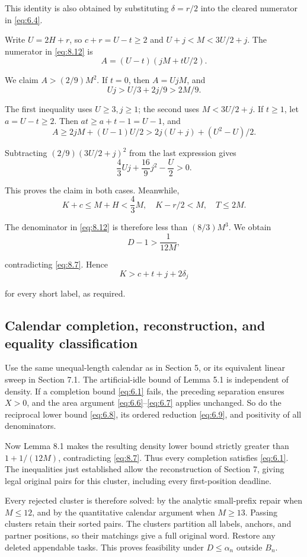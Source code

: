 \documentclass[11pt,a4paper]{article}
\begin{document}
This identity is also obtained by substituting \(\delta=r/2\) into the cleared numerator in \eqref{eq:6.4}.

Write \(U=2H+r\), so \(c+r=U-t\ge2\) and \(U+j<M<3U/2+j\). The numerator in \eqref{eq:8.12} is
\[
A=(U-t)(jM+tU/2).
\]

We claim \(A>(2/9)M^2\). If \(t=0\), then \(A=UjM\), and
\[
Uj>U/3+2j/9>2M/9.
\]

The first inequality uses \(U\ge3,j\ge1\); the second uses \(M<3U/2+j\). If \(t\ge1\), let \(a=U-t\ge2\). Then \(at\ge a+t-1=U-1\), and
\[
A\ge2jM+(U-1)U/2
>2j(U+j)+(U^2-U)/2.
\]

Subtracting \((2/9)(3U/2+j)^2\) from the last expression gives
\[
\frac43Uj+\frac{16}{9}j^2-\frac U2>0.
\]

This proves the claim in both cases. Meanwhile,
\[
K+c\le M+H<\frac43M,\quad K-r/2<M,\quad T\le2M.
\]

The denominator in \eqref{eq:8.12} is therefore less than \((8/3)M^3\). We obtain
\[
D-1>\frac1{12M},
\]

contradicting \eqref{eq:8.7}. Hence
\[
K>c+t+j+2\delta_j
\]

for every short label, as required.

\hypertarget{calendar-completion-reconstruction-and-equality-classification}{%
\subsection{Calendar completion, reconstruction, and equality classification}\label{calendar-completion-reconstruction-and-equality-classification}}

Use the same unequal-length calendar as in Section 5, or its equivalent linear sweep in Section 7.1. The artificial-idle bound of Lemma 5.1 is independent of density. If a completion bound \eqref{eq:6.1} fails, the preceding separation ensures \(X>0\), and the area argument \eqref{eq:6.6}--\eqref{eq:6.7} applies unchanged. So do the reciprocal lower bound \eqref{eq:6.8}, its ordered reduction \eqref{eq:6.9}, and positivity of all denominators.

Now Lemma 8.1 makes the resulting density lower bound strictly greater than \(1+1/(12M)\), contradicting \eqref{eq:8.7}. Thus every completion satisfies \eqref{eq:6.1}. The inequalities just established allow the reconstruction of Section 7, giving legal original pairs for this cluster, including every first-position deadline.

Every rejected cluster is therefore solved: by the analytic small-prefix repair when \(M\le12\), and by the quantitative calendar argument when \(M\ge13\). Passing clusters retain their sorted pairs. The clusters partition all labels, anchors, and partner positions, so their matchings give a full original word. Restore any deleted appendable tasks. This proves feasibility under \(D\le\alpha_n\) outside \(B_n\).
\end{document}
